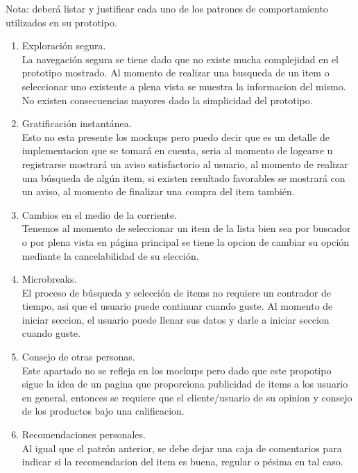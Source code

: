 \documentclass[a4paper,12pt]{article}
\begin{document}
\begin{itemize}
Nota: deberá listar y justificar cada uno de los patrones de comportamiento utilizados en su prototipo.

\begin{enumerate}
\item Exploración segura.\\
	La navegación segura se tiene dado que no existe mucha complejidad en el prototipo mostrado. Al momento de realizar una busqueda de un item o seleccionar uno existente a plena vista se muestra la informacion del mismo. No existen consecuencias mayores dado la simplicidad del prototipo.
	
\item Gratificación instantánea.\\
	Esto no esta presente los mockups pero puedo decir que es un detalle de implementacion que se tomará en cuenta, seria al momento de logearse u registrarse mostrará un aviso satisfactorio al usuario, al momento de realizar una búsqueda de algún item, si existen resultado favorables se mostrará con un aviso, al momento de finalizar una compra del item también.

\item Cambios en el medio de la corriente.\\
	Tenemos al momento de seleccionar un item de la lista bien sea por buscador o por plena vista en página principal se tiene la opcion de cambiar su opción mediante la cancelabilidad de su elección. 

\item Microbreaks.\\
	El proceso de búsqueda y selección de items no requiere un contrador de tiempo, asi que el usuario puede continuar cuando guste. Al momento de iniciar seccion, el usuario puede llenar sus datos y darle a iniciar seccion cuando guste.

\item Consejo de otras personas.\\
	Este apartado no se refleja en los mockups pero dado que este propotipo sigue la idea de un pagina que proporciona publicidad de items a los usuario en general, entonces se requiere que el cliente/usuario de su opinion y consejo de los productos bajo una calificacion.

\item Recomendaciones personales.\\
	Al igual que el patrón anterior, se debe dejar una caja de comentarios para indicar si la recomendacion del item es buena, regular o pésima en tal caso.

\end{enumerate}

\end{itemize}
\end{document}
